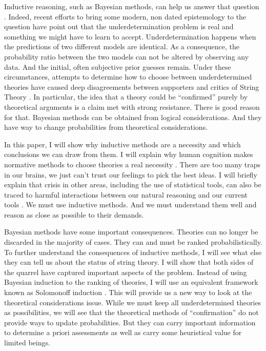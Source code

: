 \documentclass{article}
\begin{document}
	
	
	Inductive reasoning, such as Bayesian methods, can help us answer that question \cite{jaynes03}. Indeed, recent efforts to bring some modern, non dated epistemology to the question \cite{dawid13a} have point out that the underdetermination problem is real and something we might have to learn to accept. Underdetermination happens when the predictions of two different models are identical. As a consequence, the probability ratio between the two models can not be altered by observing any data. And the initial, often subjective prior guesses remain. Under these circumstances, attempts to determine how to choose between underdetermined theories have caused deep disagreements between supporters and critics of String Theory \cite{castelvecchi15a}. In particular, the idea that a theory could be ``confirmed'' purely by theoretical arguments \cite{dawid06a} is a claim met with strong resistance. There is good reason for that. Bayesian methods can be obtained from logical considerations. And they have way to change probabilities from theoretical considerations. 
	
	In this paper, I will show why inductive methods are a necessity and which conclusions we can draw from them. I will explain why human cognition makes normative methods to choose theories a real necessity \cite{martins16b}. There are too many traps in our brains, we just can't trust our feelings to pick the best ideas. I will briefly explain that crisis in other areas, including the use of statistical tools, can also be traced to harmful interactions between our natural reasoning and our current tools \cite{martins16b}. We must use inductive methods. And we must understand them well and reason as close as possible to their demands. 
	
	Bayesian methods have some important consequences. Theories can no longer be discarded in the majority of cases. They can and must be ranked probabilistically. To further understand the consequences of inductive methods, I will see what else they can tell us about the status of string theory. I will show that both sides of the quarrel have captured important aspects of the problem. Instead  of using Bayesian induction to the ranking of theories, I will use an equivalent framework known as Solomonoff induction \cite{solomonoff64a}. This will provide us a new way to look at the theoretical considerations issue.  While we must keep all underdetermined theories as possibilities, we will see that the theoretical methods of ``confirmation'' do not provide ways to update probabilities. But they can carry important information to determine a priori assessments as well as carry some heuristical value for limited beings.
	
\end{document}
